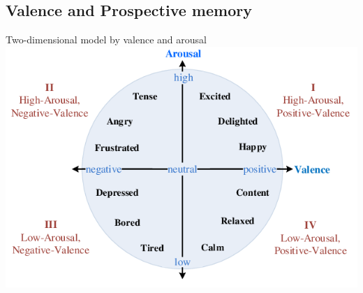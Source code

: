 \documentclass[xcolor=x11names,compress]{beamer}
\renewcommand{\(}{\begin{columns}}
\renewcommand{\)}{\end{columns}}
\newcommand{\<}[1]{\begin{column}{#1}}
\renewcommand{\>}{\end{column}}
\begin{document}

\subsection{Valence and Prospective memory}
\begin{frame}{Two-dimensional model by valence and arousal}
\includegraphics[scale=1.5]{Figure-1-Two-dimensional-valence-arousal-space.png} 
\centering
\end{frame}

\end{document}
